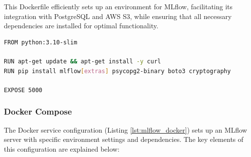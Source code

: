 This Dockerfile efficiently sets up an environment for MLflow, facilitating its integration with PostgreSQL and AWS S3, while ensuring that all necessary dependencies are installed for optimal functionality.

\begin{lstlisting}[language=bash, caption=Dockerfile MlFlow,  label={lst:mlflow_dockerfile}]
FROM python:3.10-slim

RUN apt-get update && apt-get install -y curl
RUN pip install mlflow[extras] psycopg2-binary boto3 cryptography 

EXPOSE 5000
\end{lstlisting}


\subsubsection{Docker Compose}

The Docker service configuration (Listing \ref{lst:mlflow_docker}) sets up an MLflow server with specific environment settings and dependencies. The key elements of this configuration are explained below:

